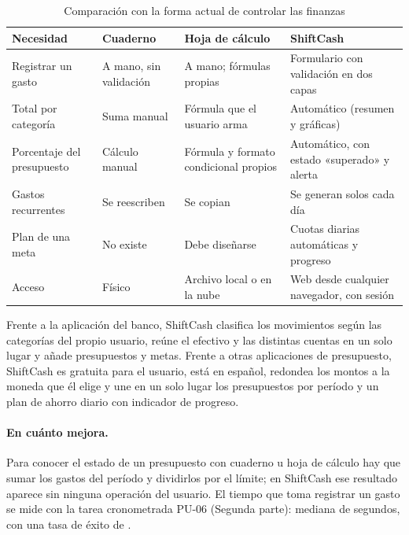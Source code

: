 \begin{table}[H]
\caption{Comparación con la forma actual de controlar las finanzas}
\label{tab:valor}
\begin{tabularx}{\linewidth}{L{3.5cm} Y Y Y}
\toprule
Necesidad & Cuaderno & Hoja de cálculo & ShiftCash \\
\midrule
Registrar un gasto & A mano, sin validación & A mano; fórmulas propias & Formulario con validación en dos capas \\
Total por categoría & Suma manual & Fórmula que el usuario arma & Automático (resumen y gráficas) \\
Porcentaje del presupuesto & Cálculo manual & Fórmula y formato condicional propios & Automático, con estado «superado» y alerta \\
Gastos recurrentes & Se reescriben & Se copian & Se generan solos cada día \\
Plan de una meta & No existe & Debe diseñarse & Cuotas diarias automáticas y progreso \\
Acceso & Físico & Archivo local o en la nube & Web desde cualquier navegador, con sesión \\
\bottomrule
\end{tabularx}
\end{table}

Frente a la aplicación del banco, ShiftCash clasifica los movimientos según las categorías del propio usuario, reúne el efectivo y las distintas cuentas en un solo lugar y añade presupuestos y metas. Frente a otras aplicaciones de presupuesto, ShiftCash es gratuita para el usuario, está en español, redondea los montos a la moneda que él elige y une en un solo lugar los presupuestos por período y un plan de ahorro diario con indicador de progreso.

\paragraph{En cuánto mejora.} Para conocer el estado de un presupuesto con cuaderno u hoja de cálculo hay que sumar los gastos del período y dividirlos por el límite; en ShiftCash ese resultado aparece sin ninguna operación del usuario. El tiempo que toma registrar un gasto se mide con la tarea cronometrada PU-06 (Segunda parte): mediana de \resPUMediana{} segundos, con una tasa de éxito de \resPUExito.
